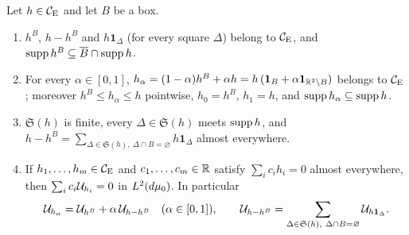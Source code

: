 \begin{auxlemma}\label{aux:notation-cutoffs}
Let $h\in\mathcal{C}_{\mathrm E}$ and let $B$ be a box.
\begin{enumerate}
\item[\textup{(i)}] $h^B$, $h-h^B$ and $h\mathbf 1_\Delta$ (for every square $\Delta$) belong
to $\mathcal{C}_{\mathrm E}$, and $\operatorname{supp} h^B\subseteq\overline B\cap\operatorname{supp} h$.
\item[\textup{(ii)}] For every $\alpha\in[0,1]$, $h_\alpha=(1-\alpha)h^B+\alpha h=h\,(\mathbf
1_B+\alpha\mathbf 1_{\mathbb{R}^2\setminus B})$ belongs to $\mathcal{C}_{\mathrm E}$; moreover $h^B\le h_\alpha\le h$
pointwise, $h_0=h^B$, $h_1=h$, and $\operatorname{supp} h_\alpha\subseteq\operatorname{supp} h$.
\item[\textup{(iii)}] $\mathfrak S(h)$ is finite, every $\Delta\in\mathfrak S(h)$ meets
$\operatorname{supp} h$, and $h-h^B=\sum_{\Delta\in\mathfrak S(h),\ \Delta\cap B=\varnothing}h\mathbf
1_\Delta$ almost everywhere.
\item[\textup{(iv)}] If $h_1,\dots,h_m\in\mathcal{C}_{\mathrm E}$ and $c_1,\dots,c_m\in\mathbb{R}$ satisfy
$\sum_ic_ih_i=0$ almost everywhere, then $\sum_ic_i\mathcal U_{h_i}=0$ in $L^2(d\mu_0)$.  In
particular
\[
 \mathcal U_{h_\alpha}=\mathcal U_{h^B}+\alpha\,\mathcal U_{h-h^B}\quad(\alpha\in[0,1]),\qquad
 \mathcal U_{h-h^B}=\sum_{\Delta\in\mathfrak S(h),\ \Delta\cap B=\varnothing}\mathcal U_{h\mathbf 1_\Delta} .
\]
\end{enumerate}
\end{auxlemma}

